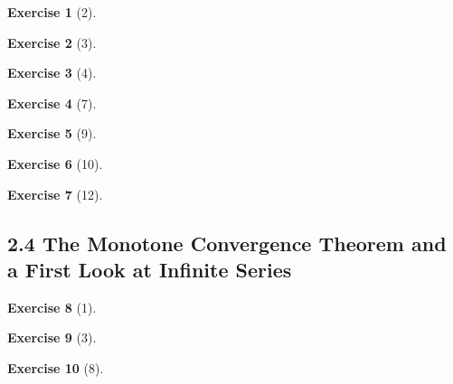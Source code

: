 \documentclass{amsart}
\theoremstyle{definition}
\newtheorem*{exercise}{Exercise}
\begin{document}
\begin{exercise}[2]
\end{exercise}

\begin{exercise}[3]
\end{exercise}

\begin{exercise}[4]
\end{exercise}

\begin{exercise}[7]
\end{exercise}

\begin{exercise}[9]
\end{exercise}

\begin{exercise}[10]
\end{exercise}

\begin{exercise}[12]
\end{exercise}

\subsection*{2.4 The Monotone Convergence Theorem and a First Look at Infinite
Series}

\begin{exercise}[1]
\end{exercise}

\begin{exercise}[3]
\end{exercise}

\begin{exercise}[8]
\end{exercise}
\end{document}
